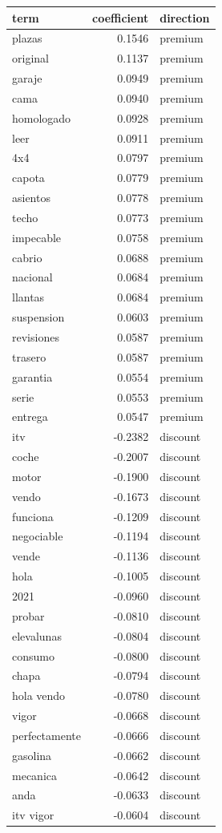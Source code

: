 \begin{tabular}{lrl}
\toprule
term & coefficient & direction \\
\midrule
plazas & 0.1546 & premium \\
original & 0.1137 & premium \\
garaje & 0.0949 & premium \\
cama & 0.0940 & premium \\
homologado & 0.0928 & premium \\
leer & 0.0911 & premium \\
4x4 & 0.0797 & premium \\
capota & 0.0779 & premium \\
asientos & 0.0778 & premium \\
techo & 0.0773 & premium \\
impecable & 0.0758 & premium \\
cabrio & 0.0688 & premium \\
nacional & 0.0684 & premium \\
llantas & 0.0684 & premium \\
suspension & 0.0603 & premium \\
revisiones & 0.0587 & premium \\
trasero & 0.0587 & premium \\
garantia & 0.0554 & premium \\
serie & 0.0553 & premium \\
entrega & 0.0547 & premium \\
itv & -0.2382 & discount \\
coche & -0.2007 & discount \\
motor & -0.1900 & discount \\
vendo & -0.1673 & discount \\
funciona & -0.1209 & discount \\
negociable & -0.1194 & discount \\
vende & -0.1136 & discount \\
hola & -0.1005 & discount \\
2021 & -0.0960 & discount \\
probar & -0.0810 & discount \\
elevalunas & -0.0804 & discount \\
consumo & -0.0800 & discount \\
chapa & -0.0794 & discount \\
hola vendo & -0.0780 & discount \\
vigor & -0.0668 & discount \\
perfectamente & -0.0666 & discount \\
gasolina & -0.0662 & discount \\
mecanica & -0.0642 & discount \\
anda & -0.0633 & discount \\
itv vigor & -0.0604 & discount \\
\bottomrule
\end{tabular}
